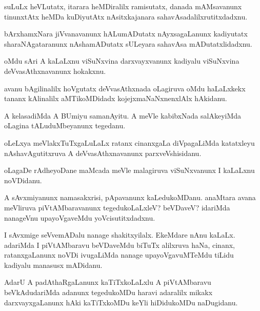\begin{mng}
suLuLx heVLutatx, itarara heMDiralilx ramisutatx, danada mAMsavanunx tinunxtAtx heMDa kuDiyutAtx nAsitxkajanara sahavAsadalilxrutitxdadxnu.
\end{mng}

\begin{mng}
bArxhamxNara jiVvanavanunx hALumADutatx nAyxsagaLanunx kadiyutatx sharaNAgataranunx nAshamADutatx sULeyara sahavAsa mADutatxlidadxnu.
\end{mng}

\begin{mng}
oMdu sAri A kaLaLxnu viSuNxvina darxvayxvanunx kadiyalu viSuNxvina  deVvasAthxnavanunx hokakxnu.
\end{mng}

\begin{mng}
avanu bAgilinalilx hoVgutatx deVvasAthxnada oLagiruva oMdu haLaLxkekx tananx kAlinalilx aMTikoMDidadx kojejxmaNaNxnenxlAlx hAkidanu.
\end{mng}

\begin{mng}
A kelasadiMda A BUmiyu samanAyitu. A meVle kabibxNada salAkeyiMda oLagina tALuduMbeyanunx tegedanu.
\end{mng}

\begin{mng}
oLeLxya meVlakxTuTxgaLuLaLx ratanx cinanxgaLa diVpagaLiMda katatxleyu nAshavAgutitxruva A deVvasAthxnavanunx parxveVshisidanu.
\end{mng}

\begin{mng}
oLagaDe rAdheyoDane maMcada meVle malagiruva viSuNxvanunx I kaLaLxnu noVDidanu.
\end{mng}

\begin{mng}
A sAvxmiyanunx namasakxrisi, pApavanunx kaLedukoMDanu. anaMtara avana meVliruva piVtAMbaravanunx tegedukoLaLxleV? beVDaveV? idariMda nanageVnu upayoVgaveMdu yoVcisutitxdadxnu.
\end{mng}

\begin{mng}
I sAvxmige seVvemADalu nanage shakitxyilalx. EkeMdare nAnu kaLaLx. adariMda I piVtAMbaravu beVDaveMdu biTuTx alilxruva haNa, cinanx, ratanxgaLanunx noVDi ivugaLiMda nanage upayoVgavuMTeMdu tiLidu kadiyalu manasusx mADidanu.
\end{mng}

\begin{mng}
AdarU A padAthaRgaLanunx kaTiTxkoLaLxlu A piVtAMbaravu beVkAdudariMda adanunx tegedukoMDu haravi adaralilx mikakx darxvayxgaLanunx hAki kaTiTxkoMDu keYli hiDidukoMDu naDugidanu.
\end{mng}

